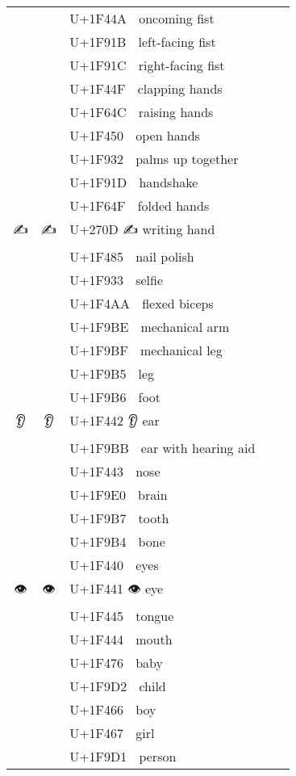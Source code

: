 \documentclass[a4paper,12pt]{ltjarticle}
\newcommand{\fontA}[1]{{\fontspec[RawFeature={mode=harf,+dist,+ccmp}]{Segoe UI Emoji} #1}}
\newcommand{\fontB}[1]{{\fontspec[RawFeature={mode=harf,+dist,+ccmp}]{Noto Color Emoji} #1}}
\begin{document}
\begin{longtable}[c]{ccp{0.8\linewidth}}
\fontA{👊}&\fontB{👊}&U+1F44A 👊 oncoming fist\\
\fontA{🤛}&\fontB{🤛}&U+1F91B 🤛 left-facing fist\\
\fontA{🤜}&\fontB{🤜}&U+1F91C 🤜 right-facing fist\\
\fontA{👏}&\fontB{👏}&U+1F44F 👏 clapping hands\\
\fontA{🙌}&\fontB{🙌}&U+1F64C 🙌 raising hands\\
\fontA{👐}&\fontB{👐}&U+1F450 👐 open hands\\
\fontA{🤲}&\fontB{🤲}&U+1F932 🤲 palms up together\\
\fontA{🤝}&\fontB{🤝}&U+1F91D 🤝 handshake\\
\fontA{🙏}&\fontB{🙏}&U+1F64F 🙏 folded hands\\
\fontA{✍}&\fontB{✍}&U+270D ✍ writing hand\\
\fontA{💅}&\fontB{💅}&U+1F485 💅 nail polish\\
\fontA{🤳}&\fontB{🤳}&U+1F933 🤳 selfie\\
\fontA{💪}&\fontB{💪}&U+1F4AA 💪 flexed biceps\\
\fontA{🦾}&\fontB{🦾}&U+1F9BE 🦾 mechanical arm\\
\fontA{🦿}&\fontB{🦿}&U+1F9BF 🦿 mechanical leg\\
\fontA{🦵}&\fontB{🦵}&U+1F9B5 🦵 leg\\
\fontA{🦶}&\fontB{🦶}&U+1F9B6 🦶 foot\\
\fontA{👂}&\fontB{👂}&U+1F442 👂 ear\\
\fontA{🦻}&\fontB{🦻}&U+1F9BB 🦻 ear with hearing aid\\
\fontA{👃}&\fontB{👃}&U+1F443 👃 nose\\
\fontA{🧠}&\fontB{🧠}&U+1F9E0 🧠 brain\\
\fontA{🦷}&\fontB{🦷}&U+1F9B7 🦷 tooth\\
\fontA{🦴}&\fontB{🦴}&U+1F9B4 🦴 bone\\
\fontA{👀}&\fontB{👀}&U+1F440 👀 eyes\\
\fontA{👁}&\fontB{👁}&U+1F441 👁 eye\\
\fontA{👅}&\fontB{👅}&U+1F445 👅 tongue\\
\fontA{👄}&\fontB{👄}&U+1F444 👄 mouth\\
\fontA{👶}&\fontB{👶}&U+1F476 👶 baby\\
\fontA{🧒}&\fontB{🧒}&U+1F9D2 🧒 child\\
\fontA{👦}&\fontB{👦}&U+1F466 👦 boy\\
\fontA{👧}&\fontB{👧}&U+1F467 👧 girl\\
\fontA{🧑}&\fontB{🧑}&U+1F9D1 🧑 person\\

\end{longtable}
\end{document}

